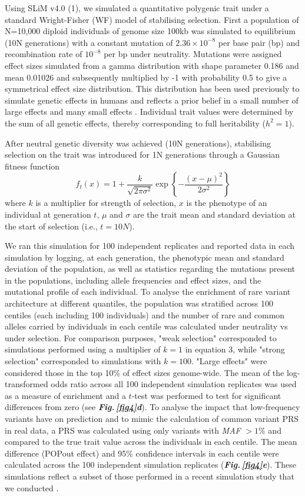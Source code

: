 \documentclass[12pt]{zHenriquesLab-StyleBioRxiv}
\newcommand\dref[2]{\normalsize{\textbf{\textit{Fig.\,\ref{#1}#2}}}\normalsize{}}
\begin{document}
Using SLiM v4.0 (1), we simulated a quantitative polygenic trait under
a standard Wright-Fisher (WF) model of stabilising selection. First a
population of N=10,000 diploid individuals of genome size 100kb was simulated to
equilibrium (10N generations) with a constant mutation of
$2.36\times 10^{-8}$ per base pair (bp) and recombination rate of
$10^{-8}$ per bp under neutrality. Mutations were assigned effect
sizes simulated from a gamma distribution with shape parameter 0.186
and mean 0.01026 and subsequently multiplied by -1 with probability
0.5 to give a symmetrical effect size distribution. This distribution
has been used previously to simulate genetic effects in humans and
reflects a prior belief in a small number of large effects and many
small effects \cite{anil3}. Individual trait values were determined by
the sum of all genetic effects, thereby corresponding to full heritability ($h^2 =1$).

After neutral genetic diversity was achieved (10N generations),
stabilising selection on the trait was introduced for 1N
generations through a Gaussian fitness function
\begin{equation} 
  f_t(x) = 1 + \frac{k}{\sqrt{2\pi\sigma^2}} \exp\left\{-\frac{(x-\mu)^2}{2\sigma^2}\right\}
\end{equation}
where $k$ is a multiplier for strength of selection,
$x$ is the phenotype of an individual at generation $t$, $\mu$
and $\sigma$ are the trait mean and standard deviation at the start of
selection (i.e., $t=10N$).

We ran this simulation for 100 independent replicates and reported data in 
each simulation by logging, at each generation, the phenotypic mean and standard 
deviation of the population, as well as statistics regarding the mutations present in the 
populations, including allele frequencies and effect sizes, and the mutational profile of each individual. 
To analyse the enrichment of rare variant architecture at different quantiles, the population 
was stratified across 100 centiles (each including 100 individuals) and the number of rare and common 
alleles carried by individuals in each centile was calculated under neutrality vs under selection.  For comparison 
purposes, "weak selection" corresponded to simulations performed using a multiplier of $k=1$ in equation 3, 
while "strong selection" corresponded to simulations with $k=100$. "Large effects" were considered 
those in the top 10\% of effect sizes genome-wide.   The mean of the log-transformed odds ratio across 
all 100 independent simulation replicates was used as a measure of enrichment and a $t$-test was 
performed to test for significant differences from zero (see \dref{fig4}{d}).  To analyse the impact 
that low-frequency variants have on prediction and to mimic the calculation of common 
variant PRS in real data, a PRS was calculated using only variants with \emph{MAF} $>1\%$ 
and compared to the true trait value across the individuals in each centile.  The mean difference (POPout effect) 
and 95\% confidence intervals in each centile were calculated across the 100 independent simulation 
replicates (\dref{fig4}{e}). These simulations reflect a subset of those performed in a recent simulation study 
that we conducted \cite{Ori2024}.
\end{document}
